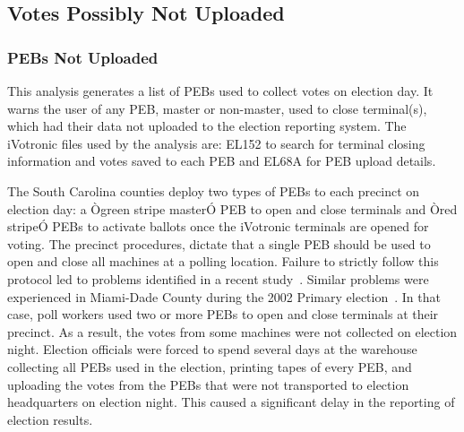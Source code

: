 \subsection{Votes Possibly Not Uploaded}
\subsubsection{PEBs Not Uploaded}
This analysis generates a list of PEBs used to collect votes on election day. It warns the user of any PEB, master or non-master, used to close terminal(s), which had their data not uploaded to the election reporting system.  The iVotronic files used by the analysis are: EL152 to search for terminal closing information and votes saved to each PEB and EL68A for PEB upload details.

The South Carolina counties deploy two types of PEBs to each precinct on election day: a Ògreen stripe masterÓ PEB to open and close terminals and Òred stripeÓ PEBs to activate ballots once the iVotronic terminals are opened for voting. The precinct procedures, dictate that a single PEB should be used to open and close all machines at a polling location. Failure to strictly follow this protocol led to problems identified in a recent study~\cite{Buell2011}.  Similar problems were experienced in Miami-Dade County during the 2002 Primary election~\cite{Mazella2002}. In that case, poll workers used two or more PEBs to open and close terminals at their precinct.  As a result, the votes from some machines were not collected on election night.  Election officials were forced to spend several days at the warehouse collecting all PEBs used in the election, printing tapes of every PEB, and uploading the votes from the PEBs that were not transported to election headquarters on election night. This caused a significant delay in the reporting of election results. 

